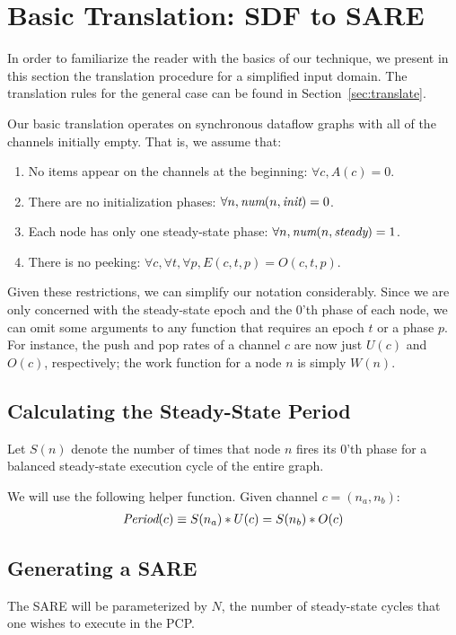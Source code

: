\section{Basic Translation: SDF to SARE}
\label{sec:simple}

In order to familiarize the reader with the basics of our technique,
we present in this section the translation procedure for a simplified
input domain.  The translation rules for the general case can be found
in Section~\ref{sec:translate}.

Our basic translation operates on synchronous dataflow graphs with all
of the channels initially empty.  That is, we assume that:
\begin{enumerate}

\item No items appear on the channels at the beginning:  $\forall c, A(c) = 0$.

\item There are no initialization phases: $\forall n, \mbox{\it num}(n, \mbox{\it init}) = 0$.

\item Each node has only one steady-state phase: $\forall n, \mbox{\it num}(n, \mbox{\it steady}) = 1$.

\item There is no peeking: $\forall c, \forall t, \forall p, E(c, t, p) = O(c, t, p)$.

\end{enumerate}

Given these restrictions, we can simplify our notation considerably.
Since we are only concerned with the steady-state epoch and the 0'th
phase of each node, we can omit some arguments to any function that
requires an epoch $t$ or a phase $p$.  For instance, the push and pop
rates of a channel $c$ are now just $U(c)$ and $O(c)$, respectively;
the work function for a node $n$ is simply $W(n)$.

\subsection{Calculating the Steady-State Period}

Let $S(n)$ denote the number of times that node $n$ fires its 0'th
phase for a balanced steady-state execution cycle of the entire
graph. 

We will use the following helper function.  Given channel $c = (n_a, n_b)$:
\begin{align*}
\mbox{\it Period}(c) \equiv S(n_a) * U(c) = S(n_b) * O(c)
\end{align*}

\subsection{Generating a SARE}

The SARE will be parameterized by $N$, the number of steady-state
cycles that one wishes to execute in the PCP.


